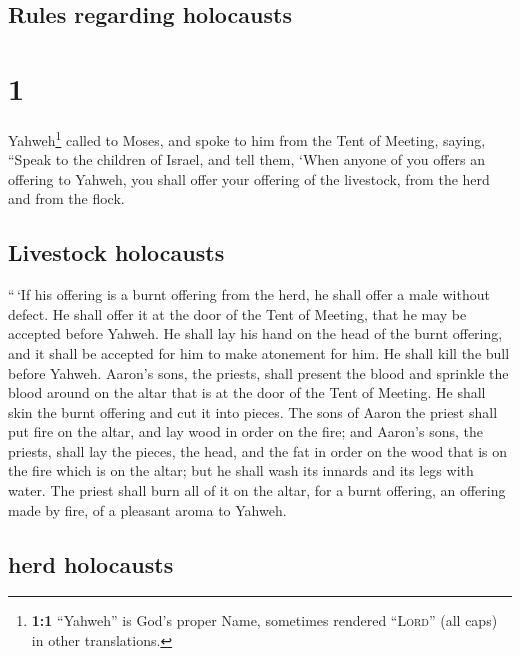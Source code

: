 \hypertarget{rules-regarding-holocausts}{%
\subsection{Rules regarding
holocausts}\label{rules-regarding-holocausts}}

\hypertarget{section}{%
\section{1}\label{section}}

 Yahweh\footnote{\textbf{1:1} ``Yahweh'' is God's proper
  Name, sometimes rendered ``\textsc{Lord}'' (all caps) in other
  translations.} called to Moses, and spoke to him from the Tent of
Meeting, saying,  ``Speak to the children of Israel, and
tell them, `When anyone of you offers an offering to Yahweh, you shall
offer your offering of the livestock, from the herd and from the flock.

\hypertarget{livestock-holocausts}{%
\subsection{Livestock holocausts}\label{livestock-holocausts}}

 ``\,`If his offering is a burnt offering from the herd,
he shall offer a male without defect. He shall offer it at the door of
the Tent of Meeting, that he may be accepted before Yahweh.
 He shall lay his hand on the head of the burnt offering,
and it shall be accepted for him to make atonement for him.
 He shall kill the bull before Yahweh. Aaron's sons, the
priests, shall present the blood and sprinkle the blood around on the
altar that is at the door of the Tent of Meeting.  He
shall skin the burnt offering and cut it into pieces.  The
sons of Aaron the priest shall put fire on the altar, and lay wood in
order on the fire;  and Aaron's sons, the priests, shall
lay the pieces, the head, and the fat in order on the wood that is on
the fire which is on the altar;  but he shall wash its
innards and its legs with water. The priest shall burn all of it on the
altar, for a burnt offering, an offering made by fire, of a pleasant
aroma to Yahweh.

\hypertarget{herd-holocausts}{%
\subsection{herd holocausts}\label{herd-holocausts}}


